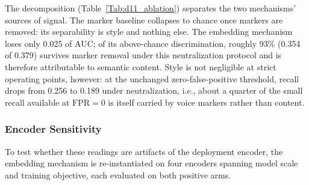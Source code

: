 \documentclass[journal]{IEEEtran}
\begin{document}
The decomposition (Table~\ref{Tab:d11_ablation}) separates the two
mechanisms' sources of signal. The marker baseline collapses to chance once
markers are removed: its separability is style and nothing else. The
embedding mechanism loses only 0.025 of AUC; of its above-chance
discrimination, roughly 93\% (0.354 of 0.379) survives marker removal under this neutralization protocol and is
therefore attributable to semantic content. Style is not negligible at strict
operating points, however: at the unchanged zero-false-positive threshold,
recall drops from 0.256 to 0.189 under neutralization, i.e., about a quarter
of the small recall available at $\mathrm{FPR}=0$ is itself carried by voice
markers rather than content.

\subsubsection{Encoder Sensitivity}
\label{Sect:V_E_3_D2}

To test whether these readings are artifacts of the deployment encoder, the
embedding mechanism is re-instantiated on four encoders spanning model scale
and training objective, each evaluated on both positive arms.

\begin{table}[!t]
    \centering
    \caption{Encoder grid for the embedding mechanism: original and marker-neutralized positive arms. ``Resid.'' is the neutralized AUC minus 0.5 (above-chance separability attributable to content).}
    \label{Tab:d2_grid}
\end{table}
\end{document}
